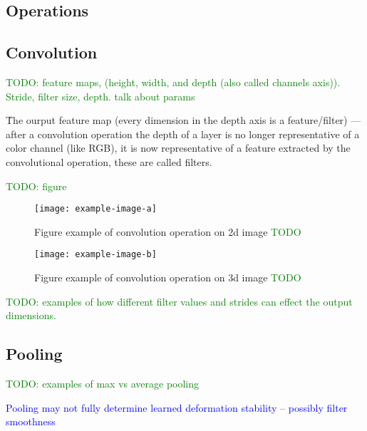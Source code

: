 
\subsection{Operations}

\subsection{Convolution}

\textcolor{green}{TODO: feature maps, (height, width, and depth (also called channels axis)). Stride, filter size, depth. talk about params}

\r{The ourput feature map (every dimension in the depth axis is a feature/filter) --- after a convolution operation the depth of a layer is no longer representative of a color channel (like RGB), it is now representative of a feature extracted by the convolutional operation, these are called filters.}

\textcolor{green}{TODO: figure}

\begin{figure}[htp]
	\centering
	\texttt{[image: example-image-a]}\hfil
	\caption{Figure example of convolution operation on 2d image \textcolor{green}{TODO}}
	\label{fig:conv_2d_example_calc}
\end{figure}

\begin{figure}[htp]
	\centering
	\texttt{[image: example-image-b]}\hfil
	\caption{Figure example of convolution operation on 3d image \textcolor{green}{TODO}}
	\label{fig:conv_2d_depth_example_calc}
\end{figure}

\textcolor{green}{TODO: examples of how different filter values and strides can effect the output dimensions.}


\subsection{Pooling}

\textcolor{green}{TODO: examples of max vs average pooling}

\textcolor{blue}{Pooling may not fully determine learned deformation stability -- possibly filter smoothness\cite{ruderman2018learned}}

